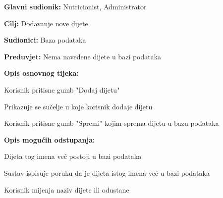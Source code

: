                     \noindent {}
                    \begin{packed_item}
    
                        \item \textbf{Glavni sudionik: }Nutricionist, Administrator
                        \item  \textbf{Cilj:} Dodavanje nove dijete
                        \item  \textbf{Sudionici:} Baza podataka
                        \item  \textbf{Preduvjet:} Nema navedene dijete u bazi podataka
                        \item  \textbf{Opis osnovnog tijeka:} 
                        
                        \item[] \begin{packed_enum}
    
                            \item Korisnik pritisne gumb "Dodaj dijetu"
                            \item Prikazuje se sučelje u koje korisnik dodaje dijetu
                            \item Korisnik pritisne gumb "Spremi" kojim sprema dijetu u bazu podataka
                        \end{packed_enum}
                        
                        \item  \textbf{Opis mogućih odstupanja:}
                        
                        \item[] \begin{packed_item}
    
                            \item[2.a] Dijeta tog imena već postoji u bazi podataka
                            \item[] \begin{packed_enum}
                                
                                \item Sustav ispisuje poruku da je dijeta istog imena već u bazi podataka
                                \item Korisnik mijenja naziv dijete ili odustane
                                
                            \end{packed_enum}


\end{packed_item}
\end{packed_item}
